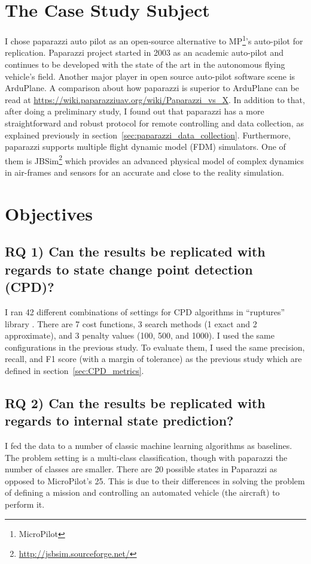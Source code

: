\section{The Case Study Subject}
I chose paparazzi auto pilot as an open-source alternative to MP\footnote{MicroPilot}'s auto-pilot for replication. Paparazzi \cite{hattenberger2014using} project started in 2003 as an academic auto-pilot and continues to be developed with the state of the art in the autonomous flying vehicle's field. Another major player in open source auto-pilot software scene is ArduPlane. A comparison about how paparazzi is superior to ArduPlane can be read at \url{https://wiki.paparazziuav.org/wiki/Paparazzi_vs_X}. 
In addition to that, after doing a preliminary study, I found out that paparazzi has a more straightforward and robust protocol for remote controlling and data collection, as explained previously in section~\ref{sec:paparazzi_data_collection}. 
Furthermore, paparazzi supports multiple flight dynamic model (FDM) simulators. One of them is JBSim\footnote{\url{http://jsbsim.sourceforge.net/}} which provides an advanced physical model of complex dynamics in air-frames and sensors for an accurate and close to the reality simulation. 


\section{Objectives}
\subsection{RQ 1) Can the results be replicated with regards to state change point detection (CPD)?}
I ran 42 different combinations of settings for CPD algorithms in ``ruptures'' library \cite{Truong2018ChangePointSurvey}. 
There are 7 cost functions, 3 search methods (1 exact and 2 approximate), and 3 penalty values (100, 500, and 1000).
I used the same configurations in the previous study. 
To evaluate them, I used the same precision, recall, and F1 score (with a margin of tolerance) as the previous study which are defined in section~\ref{sec:CPD_metrics}.

\subsection{RQ 2) Can the results be replicated with regards to internal state prediction?}
I fed the data to a number of classic machine learning algorithms as baselines. The problem setting is a multi-class classification, though with paparazzi the number of classes are smaller. 
There are 20 possible states in Paparazzi as opposed to MicroPilot's 25. This is due to their differences in solving the problem of defining a mission and controlling an automated vehicle (the aircraft) to perform it.

